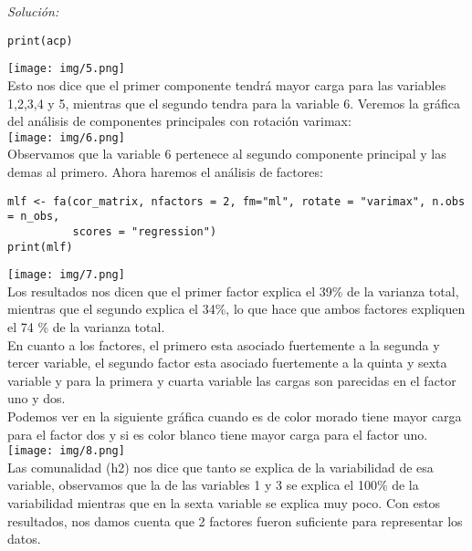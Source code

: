 \documentclass[12pt]{article}
\newenvironment{sol}
    {\emph{Solución:}
    }
    {
    }
\begin{document}
\begin{sol}
\begin{verbatim}
print(acp)
\end{verbatim}
\texttt{[image: img/5.png]}\\
Esto nos dice que el primer componente tendrá mayor carga para las variables 1,2,3,4 y 5, mientras que el segundo tendra para la variable 6. Veremos la gráfica del análisis de componentes principales con rotación varimax:\\
\texttt{[image: img/6.png]}\\
Observamos que la variable 6 pertenece al segundo componente principal y las demas al primero. Ahora haremos el análisis de factores:
\begin{verbatim}
mlf <- fa(cor_matrix, nfactors = 2, fm="ml", rotate = "varimax", n.obs = n_obs,
          scores = "regression")
print(mlf)
\end{verbatim}
\texttt{[image: img/7.png]}\\
Los resultados nos dicen que el primer factor explica el 39\% de la varianza total, mientras que el segundo explica el 34\%, lo que hace que ambos factores expliquen el 74 \% de la varianza total.\\ En cuanto a los factores, el primero esta asociado fuertemente a la segunda y tercer variable, el segundo factor esta asociado fuertemente a la quinta y sexta variable y para la primera y cuarta variable las cargas son parecidas en el factor uno y dos. \\ 
Podemos ver en la siguiente gráfica cuando es de color morado tiene mayor carga para el factor dos y si es color blanco tiene mayor carga para el factor uno.\\
\texttt{[image: img/8.png]}\\
Las comunalidad (h2) nos dice que tanto se explica de la variabilidad de esa variable, observamos que la de las variables 1 y 3 se explica el 100\% de la variabilidad mientras que en la sexta variable se explica muy poco.
Con estos resultados, nos damos cuenta que 2 factores fueron suficiente para representar los datos. 
\end{sol}



\end{document}
